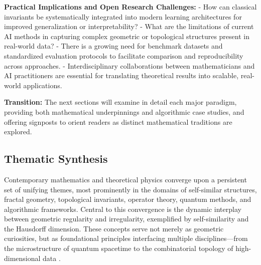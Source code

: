 \documentclass[sigconf]{acmart}
\begin{document}
\textbf{Practical Implications and Open Research Challenges:}
- How can classical invariants be systematically integrated into modern learning architectures for improved generalization or interpretability?
- What are the limitations of current AI methods in capturing complex geometric or topological structures present in real-world data?
- There is a growing need for benchmark datasets and standardized evaluation protocols to facilitate comparison and reproducibility across approaches.
- Interdisciplinary collaborations between mathematicians and AI practitioners are essential for translating theoretical results into scalable, real-world applications.

\textbf{Transition:} The next sections will examine in detail each major paradigm, providing both mathematical underpinnings and algorithmic case studies, and offering signposts to orient readers as distinct mathematical traditions are explored.

\subsection{Thematic Synthesis}

Contemporary mathematics and theoretical physics converge upon a persistent set of unifying themes, most prominently in the domains of self-similar structures, fractal geometry, topological invariants, operator theory, quantum methods, and algorithmic frameworks. Central to this convergence is the dynamic interplay between geometric regularity and irregularity, exemplified by self-similarity and the Hausdorff dimension. These concepts serve not merely as geometric curiosities, but as foundational principles interfacing multiple disciplines—from the microstructure of quantum spacetime to the combinatorial topology of high-dimensional data \cite{ref5,ref7,ref8,ref10,ref11,ref19,ref20,ref22,ref24,ref25,ref26,ref30,ref35,ref36,ref37,ref38,ref39,ref40,ref51,ref54,ref55,ref56,ref57,ref58,ref59,ref60,ref61,ref62,ref63,ref64,ref65}.
\end{document}
